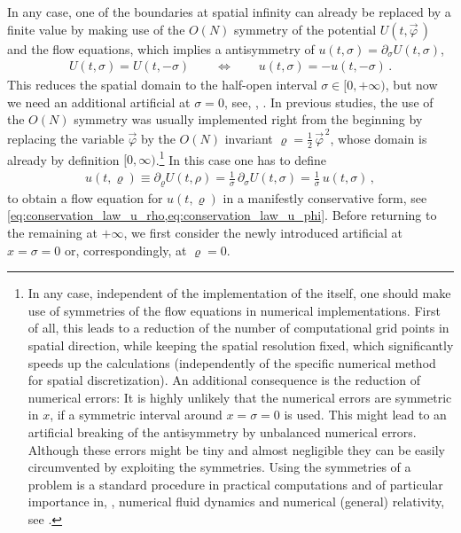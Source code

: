 In any case, one of the boundaries at spatial infinity can already be replaced by a finite value by making use of the $O ( N )$ symmetry of the potential $U ( t, \vec{\varphi} \, )$ and the flow equations, which implies a \ZII{} antisymmetry of $u ( t, \sigma ) = \partial_\sigma U ( t, \sigma )$,
\begin{align}
	U ( t, \sigma ) = U ( t, - \sigma ) \qquad\Longleftrightarrow\qquad	u ( t, \sigma ) = - u ( t, - \sigma ) \, .	\label{eq:anti-symmetry_small_u}
\end{align}
This reduces the spatial domain to the half-open interval $\sigma \in [ 0, + \infty )$, but now we need an additional artificial \bc{} at $\sigma = 0$, see, \eg{}, .
In previous studies, the use of the $O(N)$ symmetry was usually implemented right from the beginning by replacing the variable $\vec{\varphi}$ by the $O(N)$ invariant $\varrho = \tfrac{1}{2}\,\vec{\varphi}^{\, 2}$, whose domain is already by definition $[ 0, \infty )$.\footnote{%
	In any case, independent of the implementation of the \bc{} itself, one should make use of symmetries of the flow equations in numerical implementations.
	First of all, this leads to a reduction of the number of computational grid points in spatial direction, while keeping the spatial resolution fixed, which significantly speeds up the calculations (independently of the specific numerical method for spatial discretization).
	An additional consequence is the reduction of numerical errors: It is highly unlikely that the numerical errors are symmetric in $x$, if a symmetric interval around $x=\sigma=0$ is used.
	This might lead to an artificial breaking of the \ZII{} antisymmetry by unbalanced numerical errors.
	Although these errors might be tiny and almost negligible they can be easily circumvented by exploiting the symmetries.
	Using the symmetries of a problem is a standard procedure in practical computations and of particular importance in, \eg{}, numerical fluid dynamics and numerical (general) relativity, see .%
} 
In this case one has to define 
\begin{align}
	u ( t, \varrho ) \equiv \partial_\varrho U ( t, \rho ) = \tfrac{1}{\sigma} \, \partial_\sigma U ( t, \sigma ) = \tfrac{1}{\sigma} \, u ( t, \sigma ) \, ,
\end{align}
to obtain a flow equation for $u ( t, \varrho )$ in a manifestly conservative form, see \cref{eq:conservation_law_u_rho,eq:conservation_law_u_phi}.
Before returning to the remaining \bc{} at $+ \infty$, we first consider the newly introduced artificial \bc{} at ${x = \sigma =0}$ or, correspondingly, at $ \varrho=0$.


